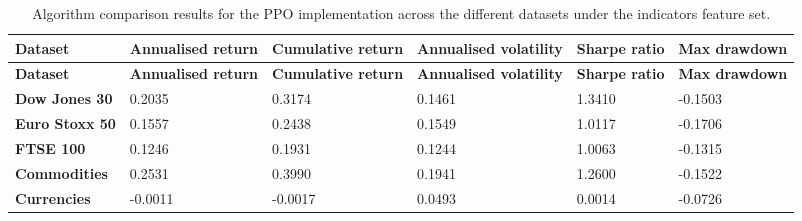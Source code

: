 \begin{longtable}{|l|p{2.1cm}|p{2.1cm}|p{2.1cm}|p{1.5cm}|p{2cm}|}
    \caption{Algorithm comparison results for the PPO implementation across the different datasets under the indicators feature set.}
    \label{tab:experiment_algorithms_ppo}
    \\ 
    \hline
    \textbf{Dataset} & \textbf{Annualised return} & \textbf{Cumulative return} & \textbf{Annualised volatility} & \textbf{Sharpe ratio} & \textbf{Max drawdown}  \\ \midrule
    \endfirsthead

    \hline
    \textbf{Dataset} & \textbf{Annualised return} & \textbf{Cumulative return} & \textbf{Annualised volatility} & \textbf{Sharpe ratio} & \textbf{Max drawdown}  \\ \midrule
    \endhead

    \endfoot
    \hline

    \textbf{Dow Jones 30} & 0.2035 & 0.3174 & 0.1461 & 1.3410 & -0.1503 \\ \hline
    \textbf{Euro Stoxx 50} & 0.1557 & 0.2438 & 0.1549 & 1.0117 & -0.1706 \\ \hline
    \textbf{FTSE 100} & 0.1246 & 0.1931 & 0.1244 & 1.0063 & -0.1315 \\ \hline
    \textbf{Commodities} & 0.2531 & 0.3990 & 0.1941 & 1.2600 & -0.1522 \\ \hline
    \textbf{Currencies} & -0.0011 & -0.0017 & 0.0493 & 0.0014 & -0.0726 \\ \hline
\end{longtable}